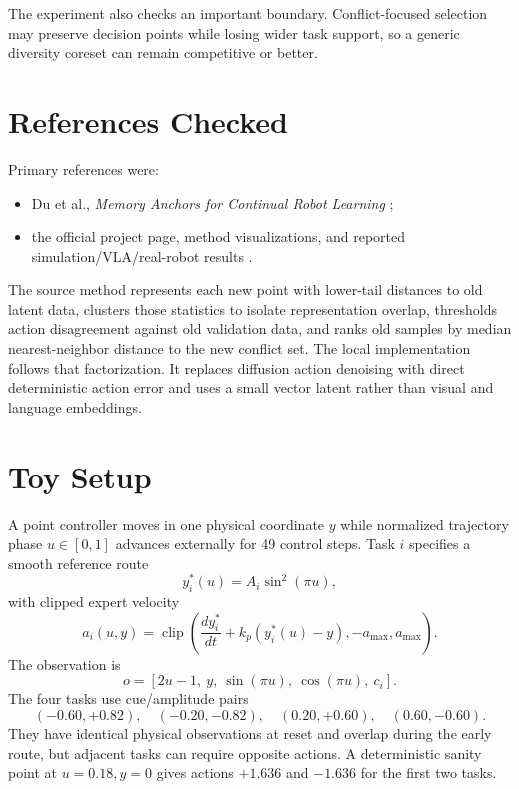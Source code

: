 \documentclass[11pt]{article}
\begin{document}
The experiment also checks an important boundary. Conflict-focused selection may preserve decision points while losing wider task support, so a generic diversity coreset can remain competitive or better.

\section{References Checked}

Primary references were:
\begin{itemize}[leftmargin=1.5em]
  \item Du et al., \emph{Memory Anchors for Continual Robot Learning} \cite{paper};
  \item the official project page, method visualizations, and reported simulation/VLA/real-robot results \cite{project}.
\end{itemize}

The source method represents each new point with lower-tail distances to old latent data, clusters those statistics to isolate representation overlap, thresholds action disagreement against old validation data, and ranks old samples by median nearest-neighbor distance to the new conflict set. The local implementation follows that factorization. It replaces diffusion action denoising with direct deterministic action error and uses a small vector latent rather than visual and language embeddings.

\section{Toy Setup}

A point controller moves in one physical coordinate $y$ while normalized trajectory phase $u\in[0,1]$ advances externally for 49 control steps. Task $i$ specifies a smooth reference route
\begin{equation}
  y_i^*(u)=A_i\sin^2(\pi u),
\end{equation}
with clipped expert velocity
\begin{equation}
  a_i(u,y)=\operatorname{clip}\!\left(\frac{d y_i^*}{dt}+k_p(y_i^*(u)-y),-a_{\max},a_{\max}\right).
\end{equation}
The observation is
\begin{equation}
  o=[2u-1,\ y,\ \sin(\pi u),\ \cos(\pi u),\ c_i].
\end{equation}
The four tasks use cue/amplitude pairs
\[
(-0.60,+0.82),\quad(-0.20,-0.82),\quad(0.20,+0.60),\quad(0.60,-0.60).
\]
They have identical physical observations at reset and overlap during the early route, but adjacent tasks can require opposite actions. A deterministic sanity point at $u=0.18,y=0$ gives actions $+1.636$ and $-1.636$ for the first two tasks.
\end{document}
